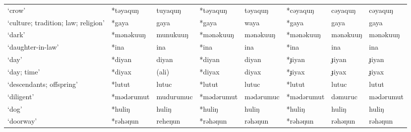 \begin{landscape}
\begin{longtable}[c]{@{}p{3cm}<{\raggedright}p{2.75cm}<{\raggedright}p{2.75cm}<{\raggedright}p{2.75cm}<{\raggedright}p{2.75cm}<{\raggedright}p{2.75cm}<{\raggedright}p{2.75cm}<{\raggedright}p{2.75cm}<{\raggedright}@{}}
`crow'                                               & *təyaquŋ           & tuyaquŋ                        & *təyaquŋ           & təyaquŋ                    & *cəyaquŋ         & cəyaquŋ                  & cəyaquŋ                           \\
`culture; tradition; law; religion'                  & *gaya              & gaya                           & *gaya              & waya                       & *gaya            & gaya                     & gaya                              \\
`dark'                                               & *mənəkuuŋ          & munukuuŋ                       & *mənəkuuŋ          & mənəkuuŋ                   & *mənəkuuŋ        & mənəkuuŋ                 & mənəkuuŋ                          \\
`daughter-in-law'                                    & *ina               & ina                            & *ina               & ina                        & *ina             & ina                      & ina                               \\
`day'                                                & *diyan             & diyan                          & *diyan             & diyan                      & *ɟiyan           & ɟiyan                    & ɟiyan                             \\
`day; time'                                          & *diyax             & (ali)                            & *diyax             & diyax                      & *ɟiyax           & ɟiyax                    & ɟiyax                             \\
`descendants; offspring'                             & *lutut             & lutuc                          & *lutut             & lutuc                      & *lutut           & lutuc                    & lutut                             \\
`diligent'                                           & *mədərumut         & mudurumuc                      & *mədərumut         & mədərumuc                  & *mədərumut       & dəmuruc                  & mədərumut                         \\
`dog'                                                & *huliŋ             & huliŋ                          & *huliŋ             & huliŋ                      & *huliŋ           & huliŋ                    & huliŋ                             \\
`doorway'                                            & *rəhəŋun           & reheŋun                        & *rəhəŋun           & rəhəŋun                    & *rəhəŋun         & rəhəŋun                  & rəhəŋun                           \\

\end{longtable}
\end{landscape}
